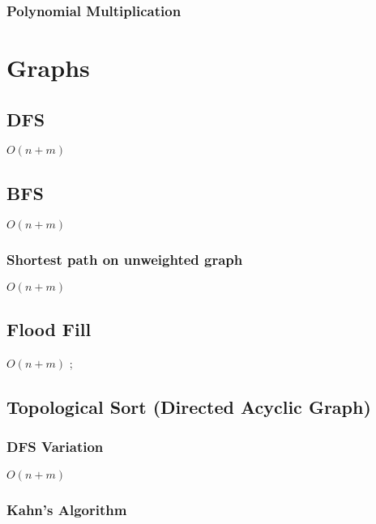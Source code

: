 \documentclass{article}
\begin{document}
\subsubsection{Polynomial Multiplication}


\section{Graphs}
\subsection{DFS}
$O(n+m)$


\subsection{BFS}
$O(n+m)$


\subsubsection{Shortest path on unweighted graph}
$O(n+m)$


\subsection{Flood Fill}
$O(n+m)$
;

\subsection{Topological Sort (Directed Acyclic Graph)}
\subsubsection{DFS Variation}
$O(n+m)$


\subsubsection{Kahn's Algorithm}

\end{document}
